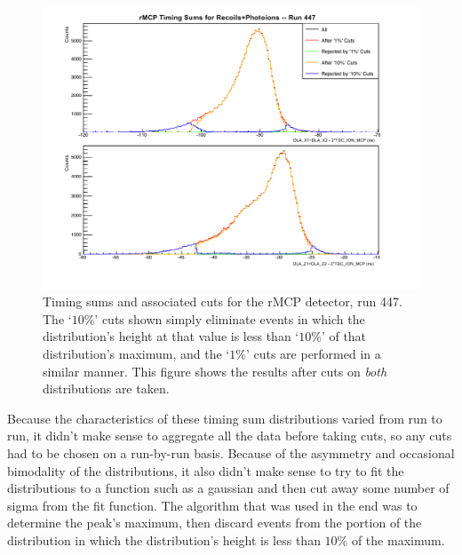 \begin{figure}[h!!tb]
	\centering
	\includegraphics[width=.999\linewidth]
	{Figures/rMCP_sumcuts_447.pdf}
	\caption[Timing sums for the rMCP, run 447.]{Timing sums and associated cuts for the rMCP detector, run 447.  The `$10\%$' cuts shown simply eliminate events in which the distribution's height at that value is less than `$10\%$' of that distribution's maximum, and the `$1\%$' cuts are performed in a similar manner.  This figure shows the results after cuts on \emph{both} distributions are taken.   
	}	
	\label{fig:sumcuts}
\end{figure}

Because the characteristics of these timing sum distributions varied from run to run, it didn't make sense to aggregate all the data before taking cuts, so any cuts had to be chosen on a run-by-run basis.  Because of the asymmetry and occasional bimodality of the distributions, it also didn't make sense to try to fit the distributions to a function such as a gaussian and then cut away some number of sigma from the fit function.  The algorithm that was used in the end was to determine the peak's maximum, then discard events from the portion of the distribution in which the distribution's height is less than $10\%$ of the maximum.  

